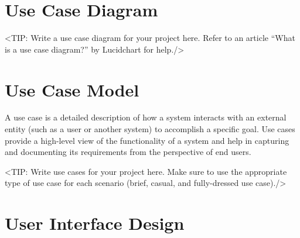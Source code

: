 


\section{Use Case Diagram}
\label{section:use-case-diagram}
<TIP: Write a use case diagram for your project here. Refer to an
article “What is a use case diagram?” by Lucidchart for help./>

\section{Use Case Model}
\label{section:use-case-model}
A use case is a detailed description of how a system
interacts with an external entity (such as a user or another system) to
accomplish a specific goal. Use cases provide a high-level view of the
functionality of a system and help in capturing and documenting its
requirements from the perspective of end users.

<TIP: Write use cases for your project here. Make sure to use the
appropriate type of use case for each scenario (brief, casual, and fully-dressed
use case)./>

\section{User Interface Design}
\label{section:user-interface-design}

